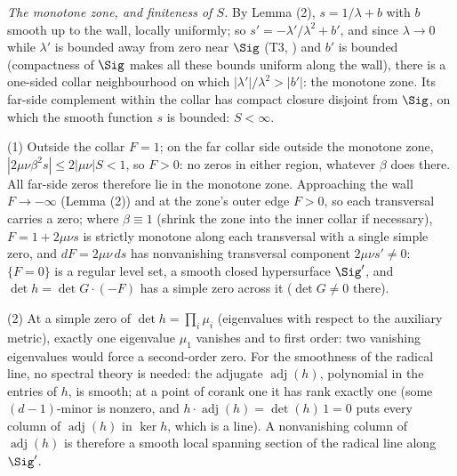 \emph{The monotone zone, and finiteness of $S$.} By Lemma (2), $s = 1/\lambda + b$ with $b$ smooth up to the wall, locally uniformly; so $s' = -\lambda'/\lambda^2 + b'$, and since $\lambda \to 0$ while $\lambda'$ is bounded away from zero near $\Sig$ (T3, ) and $b'$ is bounded (compactness of $\Sig$ makes all these bounds uniform along the wall), there is a one-sided collar neighbourhood on which $|\lambda'|/\lambda^2 > |b'|$: the monotone zone. Its far-side complement within the collar has compact closure disjoint from $\Sig$, on which the smooth function $s$ is bounded: $S < \infty$.

(1) Outside the collar $F = 1$; on the far collar side outside the monotone zone, $|2\mu\nu\beta^2 s| \leq 2|\mu\nu| S < 1$, so $F > 0$: no zeros in either region, whatever $\beta$ does there. All far-side zeros therefore lie in the monotone zone. Approaching the wall $F \to -\infty$ (Lemma (2)) and at the zone's outer edge $F > 0$, so each transversal carries a zero; where $\beta \equiv 1$ (shrink the zone into the inner collar if necessary), $F = 1 + 2\mu\nu s$ is strictly monotone along each transversal with a single simple zero, and $dF = 2\mu\nu\, ds$ has nonvanishing transversal component $2\mu\nu s' \neq 0$: $\{F = 0\}$ is a regular level set, a smooth closed hypersurface $\Sig'$, and $\det h = \det G \cdot (-F)$ has a simple zero across it ($\det G \neq 0$ there).

(2) At a simple zero of $\det h = \prod_i \mu_i$ (eigenvalues with respect to the auxiliary metric), exactly one eigenvalue $\mu_1$ vanishes and to first order: two vanishing eigenvalues would force a second-order zero. For the smoothness of the radical line, no spectral theory is needed: the adjugate $\operatorname{adj}(h)$, polynomial in the entries of $h$, is smooth; at a point of corank one it has rank exactly one (some $(d{-}1)$-minor is nonzero, and $h \cdot \operatorname{adj}(h) = \det(h)\,1 = 0$ puts every column of $\operatorname{adj}(h)$ in $\ker h$, which is a line). A nonvanishing column of $\operatorname{adj}(h)$ is therefore a smooth local spanning section of the radical line along $\Sig'$.

